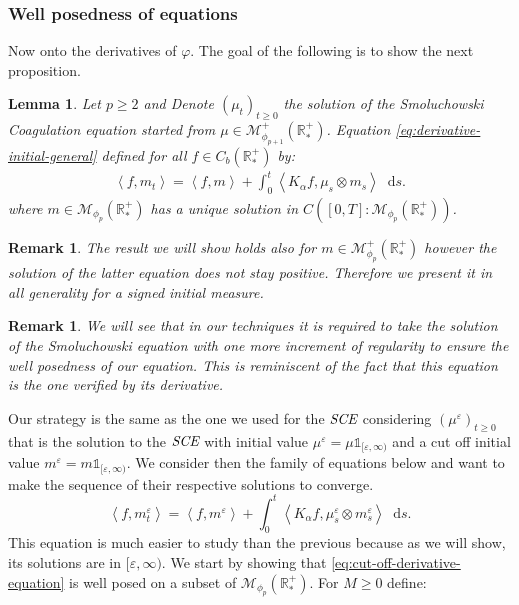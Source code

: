 \documentclass[11pt,a4paper]{article}
\newcommand{\RR}{\mathbb{R}}
\newcommand{\RRP}{\mathbb{R}^+_*}
\newcommand{\MC}{\mathcal{M}}
\newcommand{\SCE}{\emph{SCE}}
\newcommand{\Proc}[1]{\left(#1\right)_{t\geq 0}}
\newcommand{\brac}[1]{\left\langle#1\right\rangle}
\newcommand{\dd}{\mathop{}\!\mathrm{d}}
\newtheorem{lemma}[theorem]{Lemma}
\newtheorem{remark}[theorem]{Remark}
\begin{document}
\subsubsection{Well posedness of equations}
Now onto the derivatives of $\varphi$. The goal of the following is to show the next proposition.
\begin{lemma}\label{lem:well_posedness_derivative_eq}
    Let $p \geq 2$ and Denote $\Proc{\mu_t}$ the solution of the Smoluchowski Coagulation equation started from $\mu \in \MC^+_{\phi_{p + 1}}\left(\RRP\right)$. Equation \eqref{eq:derivative-initial-general} defined for all $f \in C_b(\RR^+_*)$ by:
    \begin{align*}
        \brac{f,m_t} = \brac{f,m} + \int_0^t \brac{K_\alpha f,\mu_s\otimes m_s} \dd s.
    \end{align*}
    where $m \in \MC_{\phi_p}\left(\RRP\right)$ has a unique solution in $C\left([0,T]:\MC_{\phi_p}\left(\RRP\right)\right)$.
\end{lemma}
\begin{remark}
    The result we will show holds also for $m \in \MC^+_{\phi_p}\left(\RRP\right) $ however the solution of the latter equation does not stay positive. Therefore we present it in all generality for a signed initial measure.
\end{remark}
\begin{remark}
    We will see that in our techniques it is required to take the solution of the Smoluchowski equation with one more increment of regularity to ensure the well posedness of our equation. This is reminiscent of the fact that this equation is the one verified by its derivative.
\end{remark}
Our strategy is the same as the one we used for the $\SCE$ considering $\Proc{\mu^\varepsilon}$ that is the solution to the $\SCE$ with initial value $\mu^\varepsilon = \mu\mathds{1}_{[\varepsilon,\infty)}$ and a cut off initial value $m^\varepsilon = m\mathds{1}_{[\varepsilon,\infty)}$. We consider then the family of equations below and want to make the sequence of their respective solutions to converge.
\begin{equation}\label{eq:cut-off-derivative-equation}
    \brac{f,m^\varepsilon_t} = \brac{f,m^\varepsilon} + \int_0^t \brac{K_\alpha f,\mu^\varepsilon_s\otimes m^\varepsilon_s} \dd s.
\end{equation}
This equation is much easier to study than the previous because as we will show, its solutions are in $[\varepsilon,\infty)$. We start by showing that \eqref{eq:cut-off-derivative-equation} is well posed on a subset of $\MC_{\phi_p}\left(\RRP\right)$. For $M \geq 0$ define:
\end{document}
